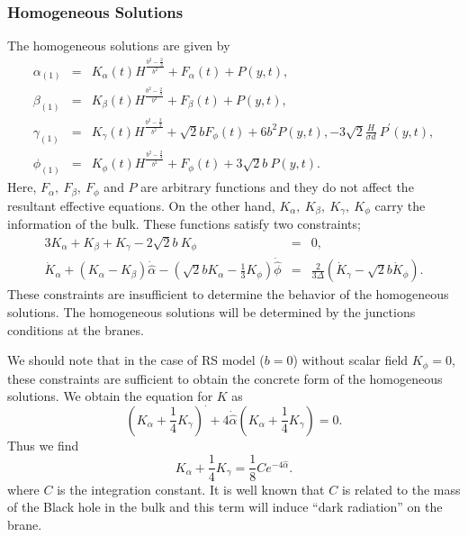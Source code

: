 \documentclass[a4paper,11pt]{article}
\begin{document}
\subsubsection{Homogeneous Solutions}
The homogeneous solutions are given by
\begin{eqnarray}
\alpha_{(1)} &=& K_{\alpha}(t)H^{\frac{b^2-\frac{2}{3}}{b^2}}+F_{\alpha}(t)
                   + P(y,t), \\
\beta_{(1)} &=&  K_{\beta}(t)H^{\frac{b^2-\frac{2}{3}}{b^2}}+ F_{\beta}(t)+ P(y,t), \\
\gamma_{(1)} &=& K_{\gamma}(t)H^{\frac{b^2-\frac{2}{3}}{b^2}}
+  \sqrt{2}b F_{\phi}(t) + 6b^2 P(y,t), 
                     -3\sqrt{2}\frac{H}{\sigma d}\ P^{\prime}(y,t),\\
\phi_{(1)} &=& K_{\phi}(t)H^{\frac{b^2-\frac{2}{3}}{b^2}}+ F_{\phi}(t)+3\sqrt{2}b\ P(y,t). 
\end{eqnarray}
Here, $F_{\alpha},\  F_{\beta},\  F_{\phi}$ and $P$ are arbitrary 
functions and they do not affect the resultant effective equations. 
On the other hand, $K_{\alpha},\ K_{\beta},\  K_{\gamma},\ K_{\phi}$ 
carry the information of the bulk. These functions satisfy
two constraints; 
\begin{eqnarray}
3K_{\alpha}+K_{\beta}+K_{\gamma}-2\sqrt{2}b\ K_{\phi}&=& 0,\nonumber\\ 
\dot{K}_{\alpha}+(K_{\alpha}-K_{\beta})\dot{\hat{\alpha}} -
\left( \sqrt{2} b K_{\alpha}- \frac{1}{3} K_{\phi} \right)  
\dot{\hat{\phi}} 
&=& \frac{2}{3 \Delta}(\dot{K}_{\gamma}- \sqrt{2} b \dot{K}_{\phi}).
\label{eq:constraint}
\end{eqnarray}
These constraints are insufficient to determine the behavior of the 
homogeneous solutions. The homogeneous solutions will be determined
by the junctions conditions at the branes.

We should note that in the case of RS model 
($b=0$) without scalar field $K_{\phi}=0$, these constraints
are sufficient to obtain the concrete form of the homogeneous solutions.  
We obtain the equation for $K$ as 
\begin{equation}
\left( K_{\alpha} +\frac{1}{4} K_ {\gamma} \right)^{\cdot} 
+4 \dot{\hat{\alpha}} \left( K_{\alpha} + \frac{1}{4} K_{\gamma} \right) =0. 
\end{equation}
Thus we find 
\begin{equation}
K_{\alpha} +\frac{1}{4}K_{\gamma} = \frac{1}{8} C e^{-4\hat{\alpha}}. 
\end{equation}
where $C$ is the integration constant. It is well known that $C$
is related to the mass of the Black hole in the bulk and 
this term will induce ``dark radiation'' on the brane. 
\end{document}

